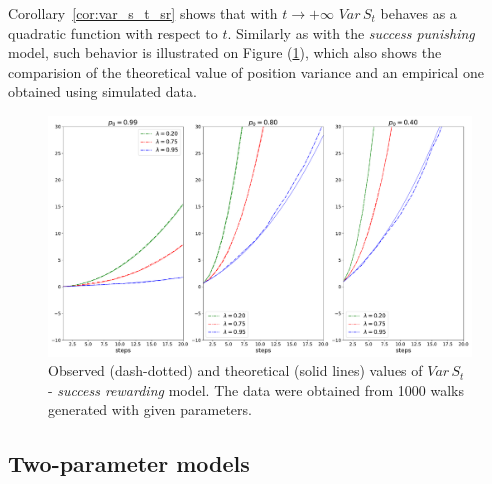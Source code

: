 \documentclass[runningheads]{CMSIM}
\begin{document}
    Corollary~\ref{cor:var_s_t_sr} shows that with $t\rightarrow+\infty$
    $Var\,S_{t}$ behaves as a quadratic function with respect to $t$.
    Similarly as with the \emph{success punishing} model, such behavior
    is illustrated on Figure (\ref{fig:var_s_t_sr}), which also shows
    the comparision of the theoretical value of position variance and
    an empirical one obtained using simulated data.

    \begin{figure}
        \includegraphics[width=1\textwidth]{../simulations/e_position_1000_walks_20_steps_type_success_rewarded}

        \caption{\label{fig:var_s_t_sr}Observed (dash-dotted) and theoretical (solid
        lines) values of $Var\,S_{t}$ - \emph{success rewarding }model.
        The
        data were obtained from 1000 walks generated with given parameters. }

    \end{figure}

    \subsection{Two-parameter models}\label{subsec:two-parameter-models}
\end{document}
